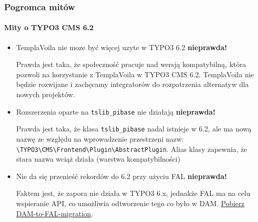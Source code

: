 \begin{frame}[fragile]
	\frametitle{Pogromca mitów}
	\framesubtitle{Mity o TYPO3 CMS 6.2}

	\begin{itemize}
		\item TemplaVoila nie moze być więcej uzyte w TYPO3 6.2
			\tabto{9cm}\color{red}\textbf{\textrightarrow nieprawda!}\color{black}

			\smaller
				Prawda jest taka, że społeczność pracuje nad wersją kompatybilną, która pozwoli na korzystanie z TemplaVoila w TYPO3 CMS 6.2. TemplaVoila nie będzie rozwijane i zachęcamy integratorów do rozpatrzenia alternatyw dla nowych projektów.
			\normalsize

		\item Rozszerzenia oparte na \texttt{tslib\_pibase} nie działają
			\tabto{9cm}\color{red}\textbf{\textrightarrow nieprawda!}\color{black}

			\smaller
				Prawda jest taka, że klasa \texttt{tslib\_pibase} nadal istnieje w 6.2, ale ma nową nazwę ze względu na wprowadzenie przestrzeni nazw: \texttt{\textbackslash TYPO3\textbackslash CMS\textbackslash Frontend\textbackslash Plugin\textbackslash AbstractPlugin}.\newline
				Alias klasy zapewnia, że stara nazwa wciąż działa (warstwa kompatybilności)
			\normalsize

		\item Nie da się przenieść rekordów do 6.2 przy użyciu FAL
			\tabto{9cm}\color{red}\textbf{\textrightarrow nieprawda!}\color{black}

			\smaller
				Faktem jest, że zapora nie działa w TYPO3 6.x, jednakże FAL ma na celu wspieranie API, co umożliwia odtworzenie tego co było w DAM. \href{https://github.com/fnagel/t3ext-dam_falmigration}{Pobierz DAM-to-FAL-migration}.
			\normalsize

	\end{itemize}

\end{frame}


